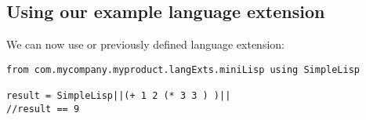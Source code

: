 \documentclass[conc-doc]{subfiles}
\begin{document}
\subsection{Using our example language extension}
We can now use or previously defined language extension:
\begin{lstlisting}
from com.mycompany.myproduct.langExts.miniLisp using SimpleLisp

result = SimpleLisp||(+ 1 2 (* 3 3 ) )||
//result == 9
\end{lstlisting}
\end{document}
